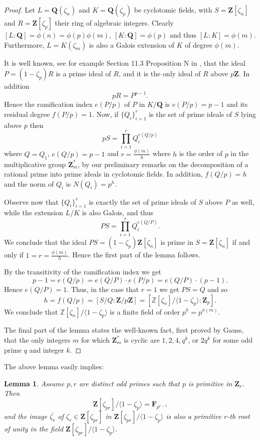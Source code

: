 \documentclass[a4paper,12pt,reqno]{amsart}
\newtheorem{lemma}[theorem]{Lemma}
\def\Z{\mathbf{Z}}
\def\Q{\mathbf{Q}}
\def\F{\mathbf{F}}
\begin{document}
\begin{proof}
Let $ L = \Q(\zeta_n) $ and $ K = \Q(\zeta_p) $ be cyclotomic fields, with \( S = \Z[\zeta_n] \) and \( R = \Z[\zeta_p] \) their  ring of algebraic integers. Clearly $[L:\Q]= \phi(n) = \phi(p) \phi(m)$,  $[K:\Q]= \phi(p)$ and thus $[L:K]= \phi(m)$. Furthermore, $L= K(\zeta_m)$ is also a Galois extension of $K$ of degree $\phi(m)$.

It is well known, see for example Section 11.3  Proposition N  in \cite{Ribe}, that the  ideal $P = ( 1 - \zeta_p ) R$ is a prime ideal of $R$, and it  is  the only ideal of $R$  above $p\Z$. In addition
\[
pR= P^{p-1}.
\]
Hence the ramification index $e(P/p)$ of $P$ in $K/\Q$ is $e(P/p)=p-1$ and its residual degree $f(P/p)= 1$.
Now, if $\{ Q_i\}_{i=1}^r$ is the set of prime ideals of $S$ lying above $p$ then 
\[
pS= \prod_{i=1}^r Q_i^{e(Q/p)}
\]
where $Q=Q_1$,  $e(Q/p)=p-1$ and $r= \frac{\phi(m)}{h}$ where $h$ is the order of $p$ in the multiplicative group $\Z_m^*$, by 	our preliminary remarks on the decomposition of a rational prime  into prime ideals in cyclotomic fields. In addition, $f(Q/p)=h$ and the norm of $Q_i$ is $N(Q_i)= p^h$. 

Observe now that   $\{Q_i\}_{i=1}^r$ is exactly  the set of prime ideals of $S$ above $P$ as well,  while  the extension $L/K$ is also Galois,  and thus 
\[
PS = \prod_{i=1}^r Q_i^{e(Q/P)}.
\]
We conclude that the ideal $PS= (1-\zeta_p)\Z[\zeta_n]$  is prime in $S= \Z[\zeta_n]$ if and only if $1=r =\frac{\phi(m)}{h}$. Hence the first part of the lemma follows. 

By the transitivity of the ramification index  we get  
\[
  p-1 = e(Q/p) = e(Q/P)\cdot e(P/p)= e(Q/P) \cdot (p-1).
\]
Hence $e(Q/P)=1$. 
Thus, in the case that  $r=1$ we get  $PS=Q$ and so 
\[
h=f(Q/p) = [S/Q:\Z/p\Z]= [
\mathbb{Z}[\zeta_{n}]/\langle 1 - \zeta_p \rangle :\Z_p].
\]
We conclude that $\mathbb{Z}[\zeta_{n}]/\langle 1 - \zeta_p \rangle $ is a finite field of order $p^h= p^{\phi(m)}$. 

The final part of the lemma states the well-known fact, first proved by Gauss, that the only integers 
$m$ for which $ \Z_m^* $ is cyclic are $1,2, 4, q^k $, or $ 2q^k $ for some odd prime $ q $ and integer $ k$. 
\end{proof}

The above lemma easily implies:

\begin{lemma} \label{Lem:z_p-primitive}
    Assume $p, r$ are distinct odd primes such that $p$ is primitive in  $\Z_r$. 
    Then \[
    \Z[\zeta_{pr}]/\langle 1- \zeta_p \rangle = \F_{p^{r-1}}
    \]
    and the image $\bar{\zeta_r}$  of $\zeta_r \in \Z[\zeta_{pr}]$ in  $\Z[\zeta_{pr}]/\langle 1- \zeta_p \rangle$  is also a primitive $r$-th root of unity in the field $\Z[\zeta_{pr}]/\langle 1- \zeta_p \rangle$.
\end{lemma}
\end{document}
